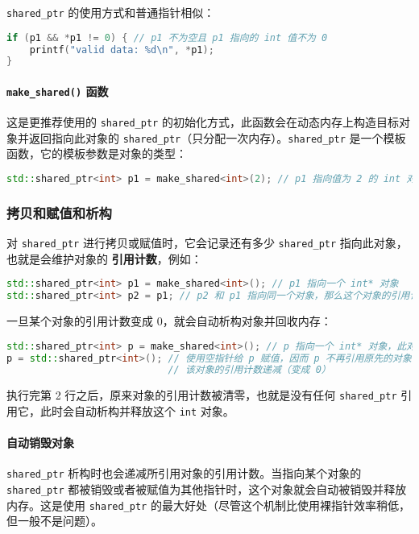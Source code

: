 \documentclass[hyperref,UTF8]{article}
\begin{document}
\texttt{shared\_ptr} 的使用方式和普通指针相似：
\begin{lstlisting}[language=c++]
if (p1 && *p1 != 0) { // p1 不为空且 p1 指向的 int 值不为 0
    printf("valid data: %d\n", *p1);
}
\end{lstlisting}

\paragraph{\texttt{make\_shared()} 函数}

这是更推荐使用的 \texttt{shared\_ptr} 的初始化方式，此函数会在动态内存上构造目标对象并返回指向此对象的 \texttt{shared\_ptr}（只分配一次内存）。\texttt{shared\_ptr} 是一个模板函数，它的模板参数是对象的类型：
\begin{lstlisting}[language=c++,numbers=none]
std::shared_ptr<int> p1 = make_shared<int>(2); // p1 指向值为 2 的 int 对象
\end{lstlisting}

\subsubsection{拷贝和赋值和析构}

对 \texttt{shared\_ptr} 进行拷贝或赋值时，它会记录还有多少 \texttt{shared\_ptr} 指向此对象，也就是会维护对象的 \textbf{引用计数}，例如：
\begin{lstlisting}[language=c++,numbers=none]
std::shared_ptr<int> p1 = make_shared<int>(); // p1 指向一个 int* 对象
std::shared_ptr<int> p2 = p1; // p2 和 p1 指向同一个对象，那么这个对象的引用计数为 2
\end{lstlisting}

一旦某个对象的引用计数变成 0，就会自动析构对象并回收内存：
\begin{lstlisting}[language=c++,numbers=none]
std::shared_ptr<int> p = make_shared<int>(); // p 指向一个 int* 对象，此对象的引用计数为 1
p = std::shared_ptr<int>(); // 使用空指针给 p 赋值，因而 p 不再引用原先的对象，
                            // 该对象的引用计数递减（变成 0）
\end{lstlisting}
执行完第 2 行之后，原来对象的引用计数被清零，也就是没有任何 \texttt{shared\_ptr} 引用它，此时会自动析构并释放这个 \texttt{int} 对象。

\paragraph{自动销毁对象}

\texttt{shared\_ptr} 析构时也会递减所引用对象的引用计数。当指向某个对象的 \texttt{shared\_ptr} 都被销毁或者被赋值为其他指针时，这个对象就会自动被销毁并释放内存。这是使用 \texttt{shared\_ptr} 的最大好处（尽管这个机制比使用裸指针效率稍低，但一般不是问题）。
\end{document}
